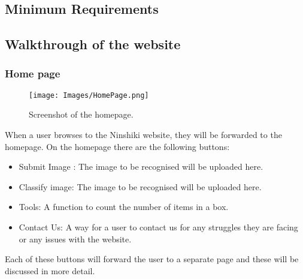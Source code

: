 \documentclass[a4paper, 12pt]{article}
\begin{document}
\subsection{Minimum Requirements}


\pagebreak
\subsection{Walkthrough of the website}
\subsubsection{Home page}
\begin{figure}[h!]
\texttt{[image: Images/HomePage.png]}
\centering
\caption{Screenshot of the homepage.}
\end{figure}
When a user browses to the Ninshiki website, they will be forwarded to the homepage. On the homepage there are the following buttons:
\begin{itemize}
\item Submit Image : The image to be recognised will be uploaded here.
\item Classify image: The image to be recognised will be uploaded here.
\item Tools: A function to count the number of items in a box.
\item Contact Us: A way for a user to contact us for any struggles they are facing or any issues with the website.
\end{itemize}
Each of these buttons will forward the user to a separate page and these will be discussed in more detail.
\pagebreak
\end{document}
